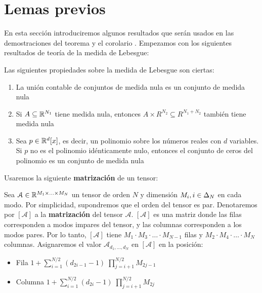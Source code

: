 \section{Lemas previos}

En esta sección introduciremos algunos resultados que serán usados en las demostraciones del teorema \customref{} y el corolario \customref{}. Empezamos con los siguientes resultados de teoría de la medida de Lebesgue:

\begin{lema} \label{lema:prop_fundamentales_medida} Las siguientes propiedades sobre la medida de Lebesgue son ciertas:

\begin{enumerate}
    \item La unión contable de conjuntos de medida nula es un conjunto de medida nula
    \item Si $A \subseteq \mathbb{R}^{N_1}$ tiene medida nula, entonces $A \times R^{N_2} \subseteq R^{N_1 + N_2}$ también tiene medida nula
    \item Sea $p \in \mathbb{R}^d[x]$, es decir, un polinomio sobre los números reales con $d$ variables. Si $p$ no es el polinomio idénticamente nulo, entonces el conjunto de ceros del polinomio es un conjunto de medida nula \cite{informatica:zeros_of_polynomial}
\end{enumerate}

\end{lema}

Usaremos la siguiente \textbf{matrización} de un tensor:

\begin{definicion}

Sea $\mathcal{A} \in \mathbb{R}^{M_1 \times \ldots \times M_N}$ un tensor de orden $N$ y dimensión $M_i, i \in \Delta_{N}$ en cada modo. Por simplicidad, supondremos que el orden del tensor es par. Denotaremos por $[\mathcal{A}]$ a la \textbf{matrización} del tensor $\mathcal{A}$. $[\mathcal{A}]$ es una matriz donde las filas corresponden a modos impares del tensor, y las columnas corresponden a los modos pares. Por lo tanto, $[\mathcal{A}]$ tiene $M_1 \cdot M_3 \cdot \ldots \cdot M_{N-1}$ filas y $M_2 \cdot M_4 \cdot \ldots \cdot M_N$ columnas. Asignaremos el valor $\mathcal{A}_{d_1, \ldots, d_N}$ en $[\mathcal{A}]$ en la posición:

\begin{itemize}
    \item Fila $1 + \sum_{i = 1}^{N/2} (d_{2i - 1} - 1) \; \prod_{j = i + 1}^{N/2} M_{2j - 1}$
    \item Columna $1 + \sum_{i = 1}^{N/2} (d_{2i} - 1) \; \prod_{j = i + 1}^{N/2} M_{2j}$
\end{itemize}

\end{definicion}


